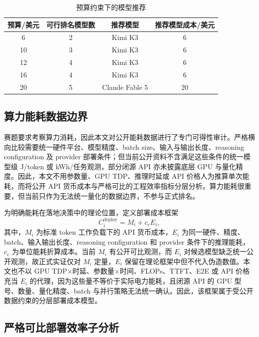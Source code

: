 \documentclass[UTF8,zihao=-4,a4paper,fontset=none]{ctexart}
\begin{document}
\begin{table}[H]
  \centering
  \caption{预算约束下的模型推荐}
  \label{tab:budget}
  \begin{tabular}{cccc}
    \toprule
    预算/美元 & 可行排名模型数 & 推荐模型 & 推荐模型成本/美元 \\
    \midrule
    6 & 2 & Kimi K3 & 6 \\
    10 & 3 & Kimi K3 & 6 \\
    12 & 4 & Kimi K3 & 6 \\
    16 & 4 & Kimi K3 & 6 \\
    20 & 5 & Claude Fable 5 & 20 \\
    \bottomrule
  \end{tabular}
\end{table}

\subsection{算力能耗数据边界}

赛题要求考察算力消耗，因此本文对公开能耗数据进行了专门可得性审计。严格横向比较需要统一硬件平台、模型精度、batch size、输入与输出长度、reasoning configuration 及 provider 部署条件；但当前公开资料不含满足这些条件的统一模型级 J/token 或 kWh/任务观测，部分闭源 API 亦未披露底层 GPU 与量化精度。因此，本文不用参数量、GPU TDP、推理时延或 API 价格人为推算单次能耗，而将公开 API 货币成本与严格可比的工程效率指标分层分析。算力能耗很重要，但当前只作为无法统一量化的数据边界，不参与正式排名。

为明确能耗在落地决策中的理论位置，定义部署成本框架
\begin{equation}
  C_i^{\mathrm{deploy}}=M_i+c_eE_i,
  \label{eq:deployment-cost}
\end{equation}
其中，$M_i$ 为标准 token 工作负载下的 API 货币成本，$E_i$ 为同一硬件、精度、batch、输入输出长度、reasoning configuration 和 provider 条件下的推理能耗，$c_e$ 为单位能耗折算成本。当前 $M_i$ 有公开可比观测，而 $E_i$ 对候选模型缺乏统一公开观测，故正式实证仅对 $M_i$ 定量，$E_i$ 保留在理论框架中但不代入伪造数值。本文也不以 GPU TDP$\times$时延、参数量$\times$时间、FLOPs、TTFT、E2E 或 API 价格充当 $E_i$ 的代理，因为这些量不等价于实际电力能耗，且闭源 API 的 GPU 型号、数量、量化精度、batch 与并行策略无法统一确认。因此，该框架属于受公开数据约束的分层部署成本模型。

\subsection{严格可比部署效率子分析}
\end{document}
